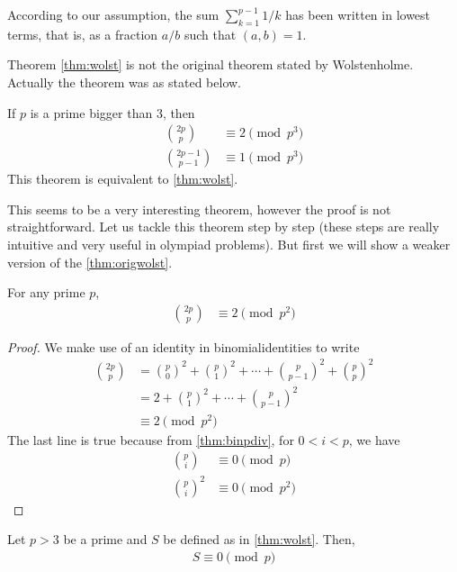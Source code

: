 	\begin{note}
		According to our assumption, the sum $ \sum_{k=1}^{p-1} 1/k$ has been written in lowest terms, that is, as a fraction $a/b$ such that $(a,b)=1$.
	\end{note}

	\begin{remark}
		Theorem \eqref{thm:wolst} is not the original theorem stated by Wolstenholme. Actually the theorem was as stated below.
	\end{remark}

	\begin{theorem}\label{thm:origwolst}
		If $p$ is a prime bigger than $3$, then
		\begin{align*}
			\binom{2p}{p} & \equiv2\pmod{p^3}\\
			\binom{2p-1}{p-1} & \equiv 1 \pmod{p^3}
		\end{align*}
		This theorem is equivalent to \autoref{thm:wolst}.
	\end{theorem}
This seems to be a very interesting theorem, however the proof is not straightforward. Let us tackle this theorem step by step (these steps are really intuitive and very useful in olympiad problems). But first we will show a weaker version of the \autoref{thm:origwolst}.
	\begin{theorem}
		For any prime $p$,
			\begin{align*}
				\binom{2p}{p} & \equiv2\pmod{p^2}
			\end{align*}
	\end{theorem}

	\begin{proof}
		We make use of an identity in \gls{binomialidentities} to write
			\begin{align*}
				\binom{2p}p & = \binom{p}0^2+\binom{p}{1}^2+\cdots+\binom{p}{p-1}^2+\binom{p}{p}^2\\
							& = 2+\binom{p}{1}^2+\cdots+\binom{p}{p-1}^2\\
							& \equiv2\pmod{p^2}
			\end{align*}
		The last line is true because from \autoref{thm:binpdiv}, for $0<i<p$, we have
			\begin{align*}
				\binom{p}{i}
					& \equiv 0\pmod p\\
				\binom{p}{i}^2
					& \equiv 0\pmod{p^2}
			\end{align*}
	\end{proof}

	\begin{lemma}\label{lem:wolstproof1}
		Let $p>3$ be a prime and $S$ be defined as in \autoref{thm:wolst}. Then,
			\begin{align*}
				S \equiv 0 \pmod p
			\end{align*}
	\end{lemma}

